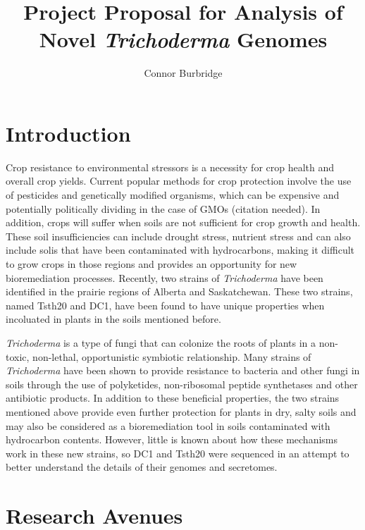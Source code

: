 \documentclass[12pt]{article}
\title{Project Proposal for Analysis of Novel \textit{Trichoderma} Genomes}
\author{Connor Burbridge}
\affil{USask NSID: cbe453 \\
  USask ID no.\ 11162928 \\
  Supervisors: Dave Schneider \& Tony Kusalik\\}
\begin{document}
\parindent=14pt
\maketitle

\clearpage
\tableofcontents
\clearpage

\section{Introduction}

Crop resistance to environmental stressors is a necessity for crop
health and overall crop yields. Current popular methods for crop
protection involve the use of pesticides and genetically modified
organisms, which can be expensive and potentially politically dividing
in the case of GMOs (citation needed). In addition, crops will suffer
when soils are not sufficient for crop growth and health. These soil
insufficiencies can include drought stress, nutrient stress and can
also include solis that have been contaminated with hydrocarbons,
making it difficult to grow crops in those regions and provides an
opportunity for new bioremediation processes. Recently, two strains of
\textit{Trichoderma} have been identified in the prairie regions of
Alberta and Saskatchewan. These two strains, named Tsth20 and DC1,
have been found to have unique properties when incoluated in plants in
the soils mentioned before.

\textit{Trichoderma} is a type of fungi that can colonize the roots of
plants in a non-toxic, non-lethal, opportunistic symbiotic
relationship.\cite{Trichoderma} Many strains of \textit{Trichoderma}
have been shown to provide resistance to bacteria and other fungi in
soils through the use of polyketides, non-ribosomal peptide
synthetases and other antibiotic
products\cite{Trichoderma}\cite{Secretome}. In addition to these
beneficial properties, the two strains mentioned above provide even
further protection for plants in dry, salty soils and may also be
considered as a bioremediation tool in soils contaminated with
hydrocarbon contents. However, little is known about how these
mechanisms work in these new strains, so DC1 and Tsth20 were sequenced
in an attempt to better understand the details of their genomes and
secretomes.

\section{Research Avenues}
\end{document}
